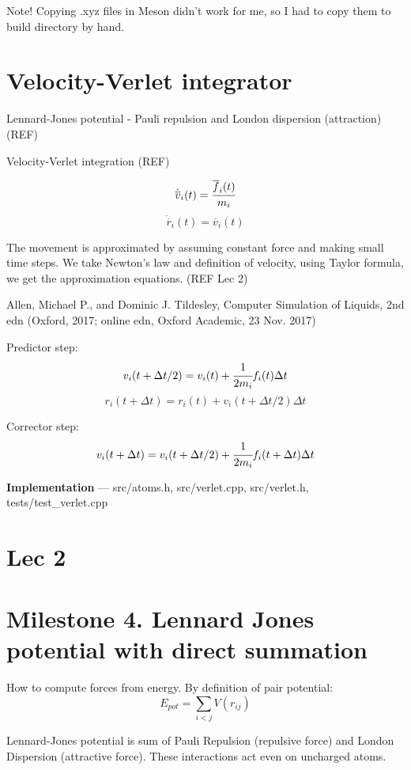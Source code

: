 \documentclass[11pt,a4paper]{article}
\title{}
\author{}
\newcommand{\mat}[1]{\overline{#1}}
\begin{document}
\maketitle

Note! Copying .xyz files in Meson didn't work for me, so I had to copy them to build directory by hand.

\section*{Velocity-Verlet integrator}

Lennard-Jones potential - Pauli repulsion and London dispersion (attraction) (REF)

Velocity-Verlet integration (REF)


\[ \dot{\mat{v}}_i(t) = \cfrac{\mat{f}_i(t)}{m_i} \]
\[ \dot{\mat{r}}_i(t) = \mat{v}_i(t) \]

The movement is approximated by assuming constant force and making small time steps. We take Newton's law and definition of velocity, using Taylor formula, we get the approximation equations. (REF Lec 2)

Allen, Michael P., and Dominic J. Tildesley, Computer Simulation of Liquids, 2nd edn (Oxford, 2017; online edn, Oxford Academic, 23 Nov. 2017)


Predictor step:
\[
v_i(t + \Delta t/2) = v_i(t) + \cfrac{1}{2m_i} f_i(t) \Delta t
\]
\[ r_i(t+\Delta t) = r_i(t) + v_i(t+ \Delta t/2) \Delta t \]

Corrector step:
\[ v_i(t+\Delta t) = v_i(t+\Delta t/2) + \cfrac{1}{2m_i}f_i(t+\Delta t) \Delta t \]

{\bf Implementation} --- src/atoms.h, src/verlet.cpp, src/verlet.h, tests/test\_verlet.cpp

\section*{Lec 2}


\section*{Milestone 4. Lennard Jones potential with direct summation}

How to compute forces from energy. By definition of pair potential:
\[
E_{pot} = \sum_{i<j} V(r_{ij})
\]

Lennard-Jones potential is sum of Pauli Repulsion (repulsive force) and London Dispersion (attractive force). These interactions act even on uncharged atoms.
\end{document}
